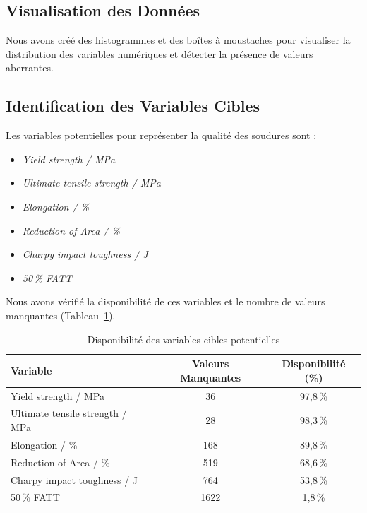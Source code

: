 \documentclass{article}
\begin{document}
\subsection{Visualisation des Données}

Nous avons créé des histogrammes et des boîtes à moustaches pour visualiser la distribution des variables numériques et détecter la présence de valeurs aberrantes.

\subsection{Identification des Variables Cibles}

Les variables potentielles pour représenter la qualité des soudures sont :

\begin{itemize}
    \item \textit{Yield strength / MPa}
    \item \textit{Ultimate tensile strength / MPa}
    \item \textit{Elongation / \%}
    \item \textit{Reduction of Area / \%}
    \item \textit{Charpy impact toughness / J}
    \item \textit{50\,\% FATT}
\end{itemize}

Nous avons vérifié la disponibilité de ces variables et le nombre de valeurs manquantes (Tableau~\ref{tab:missing_targets}).

\begin{table}[H]
    \centering
    \begin{tabular}{lcc}
    \toprule
    \textbf{Variable} & \textbf{Valeurs Manquantes} & \textbf{Disponibilité (\%)} \\
    \midrule
    Yield strength / MPa & 36 & 97,8\,\% \\
    Ultimate tensile strength / MPa & 28 & 98,3\,\% \\
    Elongation / \% & 168 & 89,8\,\% \\
    Reduction of Area / \% & 519 & 68,6\,\% \\
    Charpy impact toughness / J & 764 & 53,8\,\% \\
    50\,\% FATT & 1622 & 1,8\,\% \\
    \bottomrule
    \end{tabular}
    \caption{Disponibilité des variables cibles potentielles}
    \label{tab:missing_targets}
\end{table}
\end{document}

